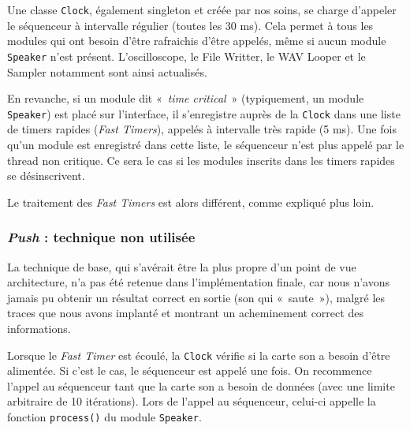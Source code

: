 Une classe \verb!Clock!, également singleton et créée par nos
soins, se charge d'appeler le séquenceur à intervalle régulier
(toutes les 30 ms). Cela permet à tous les modules qui ont besoin
d'être rafraichis d'être appelés, même si aucun module
\verb!Speaker! n'est présent. L'oscilloscope, le File Writter, le
WAV Looper et le Sampler notamment sont ainsi actualisés.

En revanche, si un module dit «~\emph{time critical}~»
(typiquement, un module \verb!Speaker!) est placé sur l'interface,
il s'enregistre auprès de la \verb!Clock! dans une liste de timers
rapides (\emph{Fast Timers}), appelés à intervalle très rapide (5
ms). Une fois qu'un module est enregistré dans cette liste, le
séquenceur n'est plus appelé par le thread non critique. Ce sera le
cas si les modules inscrits dans les timers rapides se
désinscrivent.

Le traitement des \emph{Fast Timers} est alors différent, comme
expliqué plus loin.

\subsubsection{\emph{Push} : technique non utilisée}

La technique de base, qui s'avérait être la plus propre d'un point
de vue architecture, n'a pas été retenue dans l'implémentation
finale, car nous n'avons jamais pu obtenir un résultat correct en
sortie (son qui «~saute~»), malgré les traces que nous avons
implanté et montrant un acheminement correct des informations.

Lorsque le \emph{Fast Timer} est écoulé, la \verb!Clock! vérifie si
la carte son a besoin d'être alimentée. Si c'est le cas, le
séquenceur est appelé une fois. On recommence l'appel au séquenceur
tant que la carte son a besoin de données (avec une limite
arbitraire de 10 itérations). Lors de l'appel au séquenceur,
celui-ci appelle la fonction \verb!process()! du module
\verb!Speaker!.


